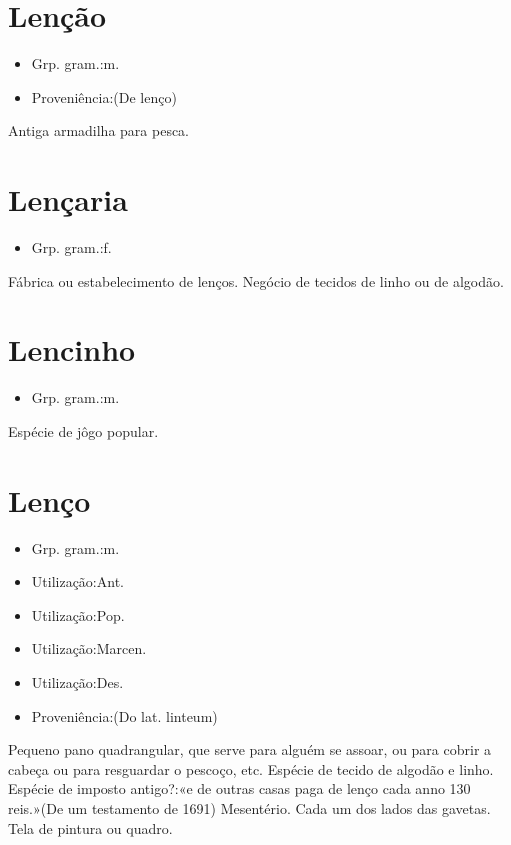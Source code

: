 \section{Lenção}
\begin{itemize}
\item {Grp. gram.:m.}
\end{itemize}
\begin{itemize}
\item {Proveniência:(De \textunderscore lenço\textunderscore )}
\end{itemize}
Antiga armadilha para pesca.
\section{Lençaria}
\begin{itemize}
\item {Grp. gram.:f.}
\end{itemize}
Fábrica ou estabelecimento de lenços.
Negócio de tecidos de linho ou de algodão.
\section{Lencinho}
\begin{itemize}
\item {Grp. gram.:m.}
\end{itemize}
Espécie de jôgo popular.
\section{Lenço}
\begin{itemize}
\item {Grp. gram.:m.}
\end{itemize}
\begin{itemize}
\item {Utilização:Ant.}
\end{itemize}
\begin{itemize}
\item {Utilização:Pop.}
\end{itemize}
\begin{itemize}
\item {Utilização:Marcen.}
\end{itemize}
\begin{itemize}
\item {Utilização:Des.}
\end{itemize}
\begin{itemize}
\item {Proveniência:(Do lat. \textunderscore linteum\textunderscore )}
\end{itemize}
Pequeno pano quadrangular, que serve para alguém se assoar, ou para cobrir a cabeça ou para resguardar o pescoço, etc.
Espécie de tecido de algodão e linho.
Espécie de imposto antigo?:«\textunderscore e de outras casas paga de lenço cada anno 130 reis.\textunderscore »(De um testamento de 1691)
Mesentério.
Cada um dos lados das gavetas.
Tela de pintura ou quadro.
